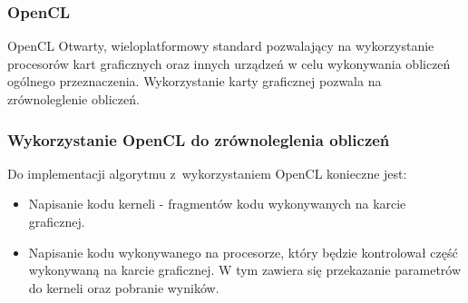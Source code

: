 \begin{frame}
\frametitle{OpenCL}
\begin{block}{OpenCL}
Otwarty, wieloplatformowy standard pozwalający na wykorzystanie procesorów kart graficznych oraz innych urządzeń w celu wykonywania obliczeń ogólnego przeznaczenia. Wykorzystanie karty graficznej pozwala na zrównoleglenie obliczeń.
\end{block}

\end{frame}


\begin{frame}
\frametitle{Wykorzystanie OpenCL do zrównoleglenia obliczeń}

Do implementacji algorytmu z~wykorzystaniem OpenCL konieczne jest:
\begin{itemize}
\item Napisanie kodu kerneli - fragmentów kodu wykonywanych na karcie graficznej.
\item Napisanie kodu wykonywanego na procesorze, który będzie kontrolował część wykonywaną na karcie graficznej. W tym zawiera się przekazanie parametrów do kerneli oraz pobranie wyników.
\end{itemize}

\end{frame}


